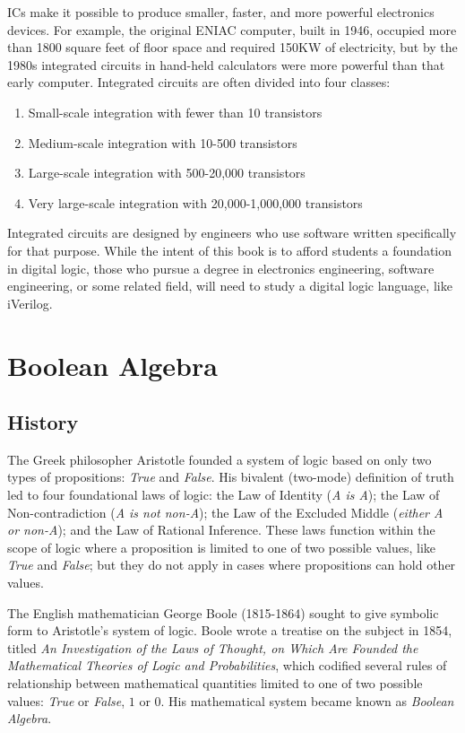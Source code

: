 \acp{IC} make it possible to produce smaller, faster, and more powerful electronics devices. For example, the original ENIAC computer, built in 1946, occupied more than 1800 square feet of floor space and required 150KW of electricity, but by the 1980s integrated circuits in hand-held calculators were more powerful than that early computer. Integrated circuits are often divided into four classes: 

\begin{enumerate}
  \item Small-scale integration with fewer than 10 transistors
  \item Medium-scale integration with 10-500 transistors
  \item Large-scale integration with 500-20,000 transistors
  \item Very large-scale integration with 20,000-1,000,000 transistors
\end{enumerate}

Integrated circuits are designed by engineers who use software written specifically for that purpose. While the intent of this book is to afford students a foundation in digital logic, those who pursue a degree in electronics engineering, software engineering, or some related field, will need to study a digital logic language, like iVerilog.

\section{Boolean Algebra}

\subsection{History}

The Greek philosopher Aristotle founded a system of logic based on only two types of propositions: \emph{True} and \emph{False}. His bivalent (two-mode) definition of truth led to four foundational laws of logic: the Law of Identity (\emph{A is A}); the Law of Non-contradiction (\emph{A is not non-A}); the Law of the Excluded Middle (\emph{either A or non-A}); and the Law of Rational Inference. These laws function within the scope of logic where a proposition is limited to one of two possible values, like \emph{True} and \emph{False}; but they do not apply in cases where propositions can hold other values.

The English mathematician George Boole (1815-1864) sought to give symbolic form to Aristotle's system of logic. Boole wrote a treatise on the subject in 1854, titled \emph{An Investigation of the Laws of Thought, on Which Are Founded the Mathematical Theories of Logic and Probabilities}, which codified several rules of relationship between mathematical quantities limited to one of two possible values: \emph{True} or \emph{False}, $ 1 $ or $ 0 $. His mathematical system became known as \emph{Boolean Algebra}.

